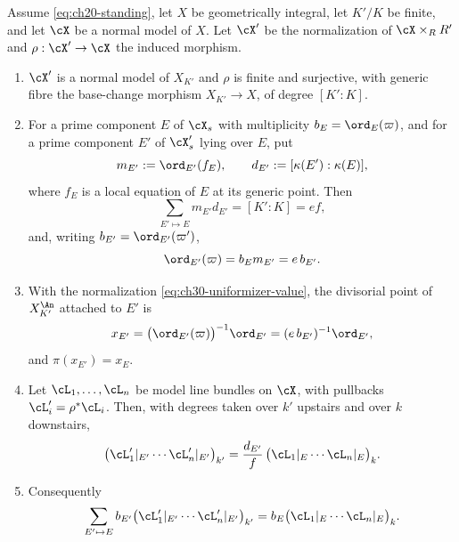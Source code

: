 \begin{lemma}
\label{lem:ch30-base-change-model}
Assume \eqref{eq:ch20-standing}, let \(X\) be geometrically integral, let
\(K'/K\) be finite, and let \(\cX\) be a normal model of \(X\).  Let
\(\cX'\) be the normalization of \(\cX\times_RR'\) and
\(\rho:\cX'\to\cX\) the induced morphism.
\begin{enumerate}
\item\label{itm:ch30-bcmod:finite}
\(\cX'\) is a normal model of \(X_{K'}\) and \(\rho\) is finite and
surjective, with generic fibre the base-change morphism
\(X_{K'}\to X\), of degree \([K':K]\).
\item\label{itm:ch30-bcmod:mult}
For a prime component \(E\) of \(\cX_s\) with multiplicity
\(b_E=\ord_E(\varpi)\), and for a prime component \(E'\) of \(\cX'_s\)
lying over \(E\), put
\[
 m_{E'}:=\ord_{E'}(f_E),
 \qquad
 d_{E'}:=[\kappa(E'):\kappa(E)],
\]
where \(f_E\) is a local equation of \(E\) at its generic point.  Then
\begin{equation}
\label{eq:ch30-ramification-sum}
 \sum_{E'\mapsto E}m_{E'}d_{E'}=[K':K]=ef,
\end{equation}
and, writing \(b_{E'}=\ord_{E'}(\varpi')\),
\begin{equation}
\label{eq:ch30-multiplicity-relation}
 \ord_{E'}(\varpi)=b_Em_{E'}=e\,b_{E'} .
\end{equation}
\item\label{itm:ch30-bcmod:points}
With the normalization \eqref{eq:ch30-uniformizer-value}, the divisorial
point of \(X_{K'}^{\An}\) attached to \(E'\) is
\[
 x_{E'}=\bigl(\ord_{E'}(\varpi)\bigr)^{-1}\ord_{E'}
       =(e\,b_{E'})^{-1}\ord_{E'},
\]
and \(\pi(x_{E'})=x_E\).
\item\label{itm:ch30-bcmod:degrees}
Let \(\cL_1,\ldots,\cL_n\) be model line bundles on \(\cX\), with pullbacks
\(\cL'_i=\rho^*\cL_i\).  Then, with degrees taken over \(k'\) upstairs and
over \(k\) downstairs,
\begin{equation}
\label{eq:ch30-degree-transfer}
 \bigl(\cL'_1|_{E'}\cdots\cL'_n|_{E'}\bigr)_{k'}
 =\frac{d_{E'}}{f}\,\bigl(\cL_1|_E\cdots\cL_n|_E\bigr)_{k} .
\end{equation}
\item\label{itm:ch30-bcmod:cancel}
Consequently
\begin{equation}
\label{eq:ch30-coefficient-cancellation}
 \sum_{E'\mapsto E}
   b_{E'}\bigl(\cL'_1|_{E'}\cdots\cL'_n|_{E'}\bigr)_{k'}
 =b_E\bigl(\cL_1|_E\cdots\cL_n|_E\bigr)_{k}.
\end{equation}
\end{enumerate}
\end{lemma}

